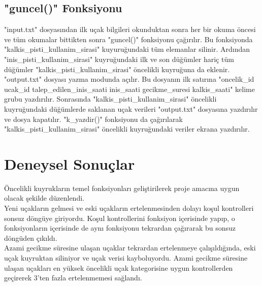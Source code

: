 \documentclass[conference]{IEEEtran}
\begin{document}
\subsection{"guncel()" Fonksiyonu}
"input.txt" dosyasından ilk uçak bilgileri okunduktan sonra her bir okuma öncesi
ve tüm okumalar bittikten sonra "guncel()" fonksiyonu çağırılır. Bu fonksiyonda 
"kalkis\_pisti\_kullanim\_sirasi" kuyuruğundaki tüm elemanlar silinir. Ardından 
"inis\_pisti\_kullanim\_sirasi" kuyruğundaki ilk ve son düğümler hariç tüm 
düğümler "kalkis\_pisti\_kullanim\_sirasi" öncelikli kuyruğuna da eklenir.\\

"output.txt" dosyası yazma modunda açılır. Bu dosyanın ilk satırına "oncelik\_id
ucak\_id talep\_edilen\_inis\_saati inis\_saati gecikme\_suresi kalkis\_saati" 
kelime grubu yazdırılır. Sonrasında "kalkis\_pisti\_kullanim\_sirasi" öncelikli 
kuyruğundaki düğümlerde saklanan uçak verileri "output.txt" dosyasına 
yazdırılır ve dosya kapatılır. "k\_yazdir()" fonksiyonu da çağırılarak 
"kalkis\_pisti\_kullanim\_sirasi" öncelikli kuyruğundaki veriler ekrana 
yazdırılır.\\

\section{Deneysel Sonuçlar}
Öncelikli kuyrukların temel fonksiyonları geliştirilerek proje amacına uygun 
olacak şekilde düzenlendi.\\

Yeni uçakların gelmesi ve eski uçakların ertelenmesinden dolayı koşul 
kontrolleri sonsuz döngüye giriyordu. Koşul kontrollerini fonksiyon içerisinde 
yapıp, o fonksiyonların içerisinde de aynı fonksiyonu tekrardan çağırarak bu 
sonsuz döngüden çıkıldı.\\

Azami gecikme süresine ulaşan uçaklar tekrardan ertelenmeye çalışıldığında, 
eski uçak kuyruktan siliniyor ve uçak verisi kayboluyordu. Azami gecikme 
süresine ulaşan uçakları en yüksek öncelikli uçak kategorisine uygun 
kontrollerden geçirerek 3'ten fazla ertelenmemesi sağlandı.\\

~\\
~\\
~\\
~\\
~\\
~\\
~\\
~\\
~\\
~\\
~\\
~\\
~\\
~\\
~\\
~\\
~\\
~\\
~\\
\end{document}
